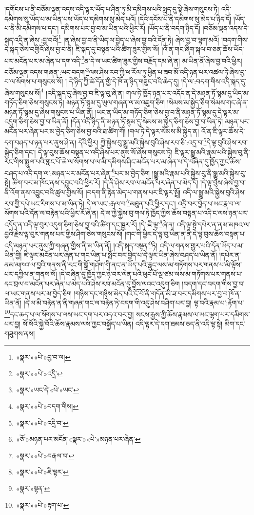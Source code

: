 །དགོངས་པ་ནི་བཅོམ་ལྡན་འདས་འདི་ལྟར་ཡོད་པ་ཤིན་ཏུ་མི་དམིགས་པའི་སླད་དུ་སྟེ་ཞེས་གསུངས་ཏེ། འདི་དམིགས་སུ་ཡོད་པ་མ་ཡིན་པས་ཡོད་པ་དམིགས་སུ་མེད་པའོ། །དེའི་དངོས་པོ་ནི་དམིགས་སུ་མེད་པ་ཉིད་དོ། །ཡོད་པ་ནི་མི་དམིགས་པ་དང་། དམིགས་པར་བྱ་བ་མ་ཡིན་པའི་ཕྱིར་རོ། །ཡོད་པ་ནི་བདག་ཉིད་དོ། །བཅོམ་ལྡན་འདས་དེ་སྐད་འདྲི་ན་ཞེས་:བྱ་བའོ།\footnote{«སྣར་»«པེ་»བྱ་བ་ལ།} །ན་ཞེས་བྱ་བ་ནི་ཡིད་ལ་བྱེད་པ་ཞེས་བྱ་བའི་དོན་ཏེ། ཞེས་བྱ་བ་ལྷག་མའོ། །བདག་གིས་དེ་སྐད་ཅེས་བགྱིའོ་ཞེས་བྱ་བ་ནི། ཇི་སྐད་དུ་བསྟན་པའི་ཚིག་ཟུར་གྱིས་སོ། །འོ་ན་གང་ཞིག་སྐལ་བ་ཅན་ཆོས་ཡོད་པར་མངོན་པར་མ་ཞེན་པ་དག་འདི་\footnote{«སྣར་»«པེ་»འདྲི་}ན་དེ་ལ་ཡང་ཚིག་ཟུར་གྱིས་བརྗོད་དམ་ཞེ་ན། མ་ཡིན་ནོ་ཞེས་བྱ་བའི་ཕྱིར། བཅོམ་ལྡན་འདས་གཞན་:ཡང་བདག་\footnote{«སྣར་»ཡང་དེ་«པེ་»ཡང་}ལས་ཤེས་རབ་ཀྱི་ཕ་རོལ་ཏུ་ཕྱིན་པ་ཟབ་མོ་འདི་ཉན་པར་འཚལ་ཏེ་ཞེས་བྱ་བ་ལ་སོགས་པ་གསུངས་སོ། །
དེ་ཉིད་ཀྱི་ཚེ་དོན་གྱི་དེ་ཁོ་ན་ཉིད་གཟུང་བའི་ཆེད་དུ། །དེ་ལ་:བདག་གིས་འདི་སྐད་དུ་ཞེས་གསུངས་སོ།\footnote{«སྣར་»«པེ་»བདག་གིས།} །འདི་སྐད་དུ་ཞེས་བྱ་བ་ཇི་ལྟ་བུ་ཞེ་ན། གལ་ཏེ་ཁྱོད་ཉན་པར་འདོད་ན་དེ་མཉན་ཏོ་སྙམ་དུ་ཡིད་མ་གཏོད་ཅིག་ཅེས་གསུངས་ཏེ། མཉན་ཏོ་སྙམ་དུ་ཡུལ་གཞན་ལ་མ་འཇུག་ཅིག །སེམས་མ་སྐྱེད་ཅིག་སེམས་གང་ཞེ་ན་མཉན་ཏོ་སྙམ་དུ་ཞེས་གསུངས་པ་ཡིན་ནོ། །ཡང་ན་ཡིད་མ་གཏོད་ཅིག་ཅེས་བྱ་བ་ནི་མཉན་ཏོ་སྙམ་དུ་དེ་ལྟར་མ་འདུག་ཅིག་ཅེས་བྱ་བ་ཡིན་ནོ། །དོན་འདི་ཉིད་ནི་མཉན་ཏོ་སྙམ་དུ་སེམས་མ་སྐྱེད་ཅིག་ཅེས་བྱ་བ་ཡིན་ཏེ། མཉན་པར་མངོན་པར་ཞེན་པར་མ་བྱེད་ཅིག་ཅེས་བྱ་བའི་ཐ་ཚིག་གོ། །གལ་ཏེ་དེ་ལྟར་སེམས་མི་སྐྱེད་ན། འོ་ན་ཇི་ལྟར་ཆོས་དེ་དག་བཤད་པ་ཉན་པར་ནུས་ཤེ་ན། དེའི་ཕྱིར། ཀྱེ་སྐྱེས་བུ་སྒྱུ་མའི་སྐྱེས་བུའི་ཤེས་རབ་ཅི་:འདྲ་བ་\footnote{«སྣར་»«པེ་»འདྲི་བ་}དེ་ལྟ་བུའི་ཤེས་རབ་སྐྱེད་ཅིག་དང་། དེ་ལྟ་བུས་ཆོས་བསྟན་པ་འདི་ཤེས་པར་ནུས་སོ་ཞེས་གསུངས་ཏེ། ཇི་ལྟར་སྒྱུ་མའི་རྣམ་པའི་སྐྱེས་བུ་ནི་རང་གིས་སྤྲུལ་པའི་གླང་པོ་ཆེ་ལ་སོགས་པ་ལ་མི་དམིགས་ཤིང་མངོན་པར་མ་ཞེན་པ་དེ་བཞིན་དུ་ཁྱོད་ཀྱང་ཆོས་བཤད་པ་འདི་དག་ལ་:མཉན་པར་མངོན་པར་ཞེན་\footnote{«ཅོ་»མཉན་པར་མངོན་«སྣར་»«པེ་»མཉན་པར་ཞེན་}པར་མ་བྱེད་ཅིག །སྒྱུ་མའི་རྣམ་པའི་སྐྱེས་བུ་ནི་སྒྱུ་མའི་སྐྱེས་བུ་སྟེ། ཚིག་བར་མ་ཁོང་ནས་དབྱུང་བའི་ཕྱིར་རོ། །དེ་ནི་ཤེས་རབ་ལ་མངོན་པར་ཞེན་པ་མེད་དོ། །དེ་ལྟ་བུས་ཞེས་བྱ་བ་ནི་འོག་ནས་འབྱུང་བའི་ཚུལ་གྱིས་སོ། །བདག་ནི་རྟེན་མེད་པ་གནས་པར་ཇི་ལྟར་སྤྲོ། འདི་ལ་སྒྱུ་མའི་སྐྱེས་བུའི་ཤེས་རབ་ཀྱི་དཔེ་ཡང་རིགས་པ་མ་ཡིན་ཏེ། དེ་ལ་ཡང་:རྒལ་བ་\footnote{«སྣར་»«པེ་»བརྒལ་བ་}མཐུན་པའི་ཕྱིར་དང་། འདྲི་བར་བྱེད་པ་ཡང་རྣ་བ་ལ་སོགས་པའི་དོན་ལ་བརྟེན་པའི་ཕྱིར་རོ་ཞེ་ན། དེ་ལ་ཀྱེ་སྐྱེས་བུ་གལ་ཏེ་ཁྱོད་ཀྱིས་ཆོས་བསྟན་པ་འདི་ང་ལས་ཉན་པར་འདོད་ན་འདི་ལྟ་བུར་འདུག་ཅིག་ཅེས་བྱ་བའི་ཚིག་དང་སྦྱར་རོ། །དེ་:ཇི་ལྟ་\footnote{«སྣར་»«པེ་»ཇི་ལྟར་}ཞེ་ན། འདི་ལྟ་སྟེ་དཔེར་ན་ནམ་མཁའ་ལ་བྱའི་རྗེས་ལྟ་བུར་གནས་པར་གྱིས་ཤིག་ཅེས་གསུངས་སོ། །གང་གི་ཕྱིར་དེ་ལྟ་བུ་ཡིན་ན་ནི་དེ་ལྟ་བུས་ཆོས་བསྟན་པ་འདི་མཉན་པར་ནུས་ཀྱི་གཞན་གྱིས་ནི་མ་ཡིན་ནོ། །འདི་སྐད་བསྟན་\footnote{«སྣར་»སྟན་}ཏེ། འདི་ལ་གནས་གྱུར་པའི་དོན་ཡོད་པ་མ་ཡིན་གྱི། ཇི་ལྟར་མངོན་པར་ཞེན་པ་གང་ཡིན་པ་སྤོང་བར་བྱེད་པ་དེ་ལྟར་ཡིན་ཞེས་བཤད་པ་ཡིན་ནོ། །དཔེར་ན་ནམ་མཁའ་ལ་བྱའི་གནས་ནི་རང་གི་སྒྲོ་གཤོག་གི་ནང་ན་ཡོད་པའི་རླུང་ལས་མ་གཏོགས་པར་གནས་པ་མི་ལྟོས་པར་དཀྱིལ་ན་གནས་སོ། །དེ་བཞིན་དུ་ཁྱོད་ཀྱང་ཉེ་བར་ལེན་པའི་ཕུང་པོ་ལྔ་ཙམ་ལས་མ་གཏོགས་པར་གནས་པ་དང་བྲལ་བ་མངོན་པར་ཞེན་པ་མེད་པའི་ཤེས་རབ་མངོན་དུ་བྱོས་ལའང་འདུག་ཅིག །བདག་དང་བདག་གིས་བྱ་བ་ལ་ཡང་གནས་པར་མ་བྱེད་ཅིག །གཉིས་དང་གཉིས་མེད་པའི་ངོ་བོ་ནི་གདོན་མི་ཟ་བར་དམིགས་པར་བྱ་བ་ཁོ་ན་ཡིན་ནོ། །དེ་ལ་མི་བརྟེན་ན་ནི་གཞན་གང་ལ་བརྟེན་ཏེ་བདག་གི་འདུ་ཤེས་བཤིག་པར་བྱ། ལྟ་བའི་རྣམ་པ་:རྟོག་པ་\footnote{«སྣར་»«པེ་»རྟག་པ་}དང་ཆད་པ་ལ་སོགས་པ་ལས་ཡང་དག་པར་འདའ་བར་བྱ། སངས་རྒྱས་ཀྱི་ཆོས་རྣམས་ལ་ཡང་ལྷག་པར་དམིགས་པར་བྱ། སོ་སོའི་སྐྱེ་བོའི་ཆོས་རྣམས་ལས་ཀྱང་བསྐྱོད་པ་ཡིན། འདི་ལྟར་དེ་དག་ཐམས་ཅད་ནི་འདི་ལྟ་སྟེ། མིག་དང་གཟུགས་ནས། 